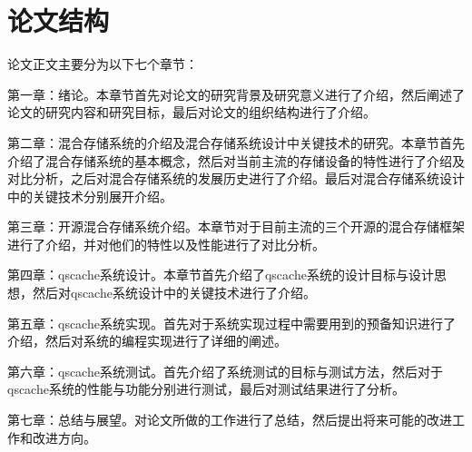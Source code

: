 \section{论文结构}

论文正文主要分为以下七个章节： 

第一章：绪论。本章节首先对论文的研究背景及研究意义进行了介绍，然后阐述了论文的研究内容和研究目标，最后对论文的组织结构进行了介绍。

第二章：混合存储系统的介绍及混合存储系统设计中关键技术的研究。本章节首先介绍了混合存储系统的基本概念，然后对当前主流的存储设备的特性进行了介绍及对比分析，之后对混合存储系统的发展历史进行了介绍。最后对混合存储系统设计中的关键技术分别展开介绍。

第三章：开源混合存储系统介绍。本章节对于目前主流的三个开源的混合存储框架进行了介绍，并对他们的特性以及性能进行了对比分析。

第四章：qscache系统设计。本章节首先介绍了qscache系统的设计目标与设计思想，然后对qscache系统设计中的关键技术进行了介绍。 

第五章：qscache系统实现。首先对于系统实现过程中需要用到的预备知识进行了介绍，然后对系统的编程实现进行了详细的阐述。 

第六章：qscache系统测试。首先介绍了系统测试的目标与测试方法，然后对于qscache系统的性能与功能分别进行测试，最后对测试结果进行了分析。 

第七章：总结与展望。对论文所做的工作进行了总结，然后提出将来可能的改进工作和改进方向。

